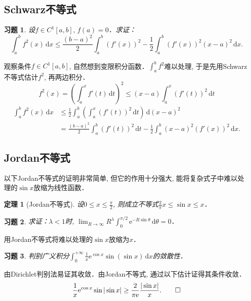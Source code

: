 \documentclass[11pt,a4paper]{ctexart}
\makeatletter
\theoremstyle{thmseries} %
\newtheorem{thm}{定理}[section]
\theoremstyle{exerseries}
\newtheorem{exer}{习题}[section]
\renewenvironment{proof}[1][\proofname]{\par
  \pushQED{\qed}%
  \normalfont \topsep6\p@\@plus6\p@\relax
  \trivlist
  \item[\hskip\labelsep
        \itshape
    #1\@addpunct{}]\ignorespaces
}{%
  \popQED\endtrivlist\@endpefalse
}
\newenvironment{sol}{\begin{proof}[\bfseries\upshape 解\quad]}{\end{proof}}
\newenvironment{pf}{\begin{proof}[\bfseries\upshape 证\quad]}{\end{proof}}
\newcommand{\bra}[1]{\mathopen{}\left(#1\right)}
\renewcommand{\d}{\mathrm{d}}
\newcommand{\e}{\mathrm{e}}
\makeatother
\begin{document}
\subsection{Schwarz不等式}
\begin{exer}
	设$f\in C^1[a,b],\,f(a)=0$．求证：
	\[\int_{a}^{b}f^2(x)\,\d x\leq\frac{(b-a)^2}{2}\int_{a}^{b}(f'(x))^2-\frac{1}{2}\int_{a}^{b}(f'(x))^2(x-a)^2\,\d x.\]
\end{exer}
\begin{pf}
	观察条件$f\in C^1[a,b]$, 自然想到变限积分函数．$\int_{a}^{b} f^2$难以处理, 于是先用Schwarz不等式估计$f^2$, 再两边积分．
	\[f^2(x)=\bra{\int_{a}^{x}f'(t)\,\d t}^2\leq(x-a)\int_{a}^{x}(f'(t))^2\,\d t\]
	\begin{align*}
		\int_{a}^{b}f^2(x)\,\d x&\leq\frac{1}{2}\int_{a}^{b}\bra{\int_{a}^{x}(f'(t))^2\,\d t}\,\d(x-a)^2\\
		&=\frac{(b-a)^2}{2}\int_{a}^{b}(f'(t))^2\,\d t-\frac{1}{2}\int_{a}^{b}(x-a)^2(f'(x))^2\,\d x.
	\end{align*}
\end{pf}


\subsection{Jordan不等式}
以下Jordan不等式的证明非常简单, 但它的作用十分强大, 能将复杂式子中难以处理的$\sin x$放缩为线性函数．
\begin{thm}[Jordan不等式]
	设$0\leq x\leq\frac{\pi}{2}$, 则成立不等式$\frac{2}{\pi}x\leq\sin x\leq x$．
\end{thm}

\begin{exer}
	求证：$\lambda<1$时, $\lim_{R\to\infty}R^\lambda\int_{0}^{\pi/2}\e^{-R\sin\theta}\,\d\theta=0$．
\end{exer}
\begin{pf}
	用Jordan不等式将难以处理的$\sin x$放缩为$x$．
\end{pf}

\begin{exer}
	判别广义积分$\int_{0}^{+\infty}\frac{1}{x}\e^{\cos x}\sin(\sin x)\,\d x$的敛散性．
\end{exer}
\begin{sol}
	由Dirichlet判别法易证其收敛．由Jordan不等式, 通过以下估计证得其条件收敛．
	\[\frac{1}{x}\e^{\cos x}\sin|\sin x|\geq\frac{2}{\pi\e}\frac{|\sin x|}{x}.\qedhere\]
\end{sol}
\end{document}
